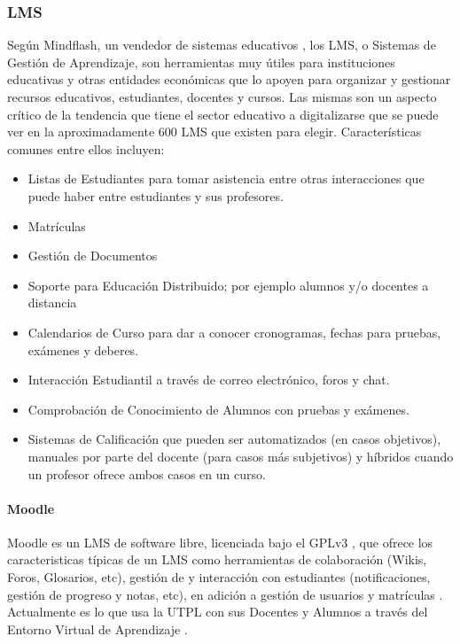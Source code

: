 \subsubsection{LMS}
Según Mindflash, un vendedor de sistemas educativos \citep{MINDFLASH-ABOUT}, los LMS, o Sistemas de Gestión de Aprendizaje, son herramientas muy útiles para instituciones educativas y otras entidades económicas que lo apoyen para organizar y gestionar recursos educativos, estudiantes, docentes y cursos. Las mismas son un aspecto crítico de la tendencia que tiene el sector educativo a digitalizarse que se puede ver en la aproximadamente 600 LMS que existen para elegir. Características comunes entre ellos incluyen: \citep{MINDFLASH-LMS}
\begin{itemize}
	\item Listas de Estudiantes para tomar asistencia entre otras interacciones que puede haber entre estudiantes y sus profesores.
    \item Matrículas
    \item Gestión de Documentos
    \item Soporte para Educación Distribuido; por ejemplo alumnos y/o docentes a distancia
    \item Calendarios de Curso para dar a conocer cronogramas, fechas para pruebas, exámenes y deberes.
    \item Interacción Estudiantil a través de correo electrónico, foros y chat.
    \item Comprobación de Conocimiento de Alumnos con pruebas y exámenes.
    \item Sistemas de Calificación que pueden ser automatizados (en casos objetivos), manuales por parte del docente (para casos más subjetivos) y híbridos cuando un profesor ofrece ambos casos en un curso.
\end{itemize}

\paragraph{Moodle}
Moodle es un LMS de software libre, licenciada bajo el GPLv3 \citep{MOODLE-GIT-License},  que ofrece los caracteristicas típicas de un LMS como herramientas de colaboración (Wikis, Foros, Glosarios, etc), gestión de y interacción con estudiantes (notificaciones, gestión de progreso y notas, etc), en adición a gestión de usuarios y matrículas \citep{MOODLE-DOCS-Features}. Actualmente es lo que usa la UTPL con sus Docentes y Alumnos a través del Entorno Virtual de Aprendizaje \citep{Lopez-Jorge}.

